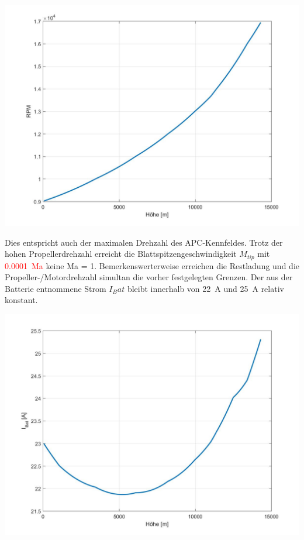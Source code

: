 \begin{center}
	\includegraphics[scale=0.3]{Diagramme/omega.jpg}
	\label{pic:omega_russland}
\end{center}
Dies entspricht auch der maximalen Drehzahl des APC-Kennfeldes. Trotz der hohen Propellerdrehzahl erreicht die Blattspitzengeschwindigkeit \ensuremath{M_{tip}} mit \textcolor{red}{\SI{0.0001}{Ma}} keine Ma = 1. Bemerkenswerterweise erreichen die Restladung und die Propeller-/Motordrehzahl simultan die vorher festgelegten Grenzen.
Der aus der Batterie entnommene Strom \ensuremath{I_Bat} bleibt innerhalb von \SI{22}{A} und \SI{25}{A} relativ konstant. 
\begin{center}
	\includegraphics[scale=0.3]{Diagramme/I_Bat.jpg}
	\label{pic:batteriestrom_russland}
\end{center}
